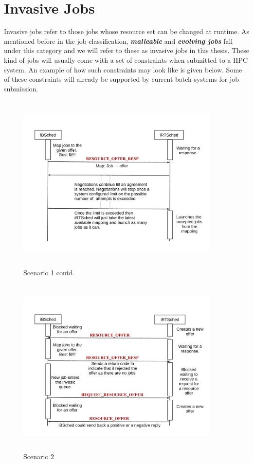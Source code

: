 \section{Invasive Jobs}
Invasive jobs refer to those jobs whose resource set can be changed at runtime. As mentioned before in the job classification, \textbf{\textit{malleable}} and \textbf{\textit{evolving jobs}} fall under this category and we will refer to these as invasive jobs in this thesis. These kind of jobs will usually come with a set of constraints when submitted to a HPC system. An example of how such constraints may look like is given below. Some of these constraints will already be supported by current batch systems for job submission.
\begin{figure}[!htbp]
\vspace{-0.25in}
\centering
\includegraphics[width=0.9\textwidth, height=90mm]{./figures/scenario1contd.pdf}
\caption{Scenario 1 contd.}
\label{fig:Seq2}
\end{figure}
\begin{figure}[!htbp]
\centering
\includegraphics[width=0.9\textwidth, height=90mm]{./figures/scenario2.pdf}
\caption{Scenario 2}
\label{fig:Seq3}
\end{figure}
